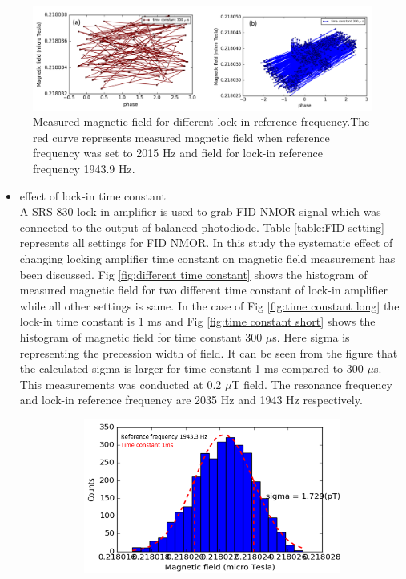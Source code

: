 \begin{figure}[h]
\centering\includegraphics[width=0.8\linewidth]{figures/phase}
\caption{Measured magnetic field for different lock-in reference frequency.The red curve represents measured magnetic field when reference frequency was set to 2015 Hz and field for lock-in reference frequency 1943.9 Hz.}
\end{figure}
\newpage
   \begin{itemize}
   \item effect of lock-in time constant\\
  A SRS-830 lock-in amplifier is used to grab FID NMOR signal which was connected to the output of balanced photodiode. Table \ref{table:FID setting} represents all settings for FID NMOR. In this study the systematic effect of changing locking amplifier time constant on magnetic field measurement has been discussed. Fig \ref{fig:different time constant}  shows the histogram of measured magnetic field for two different time constant of lock-in amplifier while all other settings is same. In the case of Fig \ref{fig:time constant long} the lock-in time constant is 1 ms and Fig \ref{fig:time constant short} shows the histogram of magnetic field for time constant 300 $\mu$s. Here sigma is representing the precession width of field. It can be seen from the figure that the calculated sigma is larger for time constant 1 ms compared to 300 $\mu$s. This measurements was conducted at 0.2 $\mu$T field. The resonance frequency and lock-in reference frequency are 2035 Hz and 1943 Hz respectively.
   \begin{figure}
    \centering
    \begin{subfigure}[b]{0.4\textwidth}
        \centering
        \includegraphics[width=\textwidth]{figures/time_constant}

\end{subfigure}
\end{figure}
\end{itemize}
